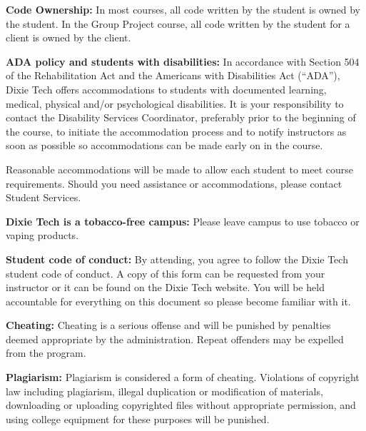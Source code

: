\textbf{Code Ownership:} In most courses, all code written by the student is owned by the student.
In the Group Project course, all code written by the student for a client is owned by the client.
\par
\bigskip
\textbf{ADA policy and students with disabilities:} In accordance with Section 504 of the Rehabilitation
Act and the Americans with Disabilities Act (“ADA”), Dixie Tech offers accommodations to students
with documented learning, medical, physical and/or psychological disabilities. It is your responsibility to
contact the Disability Services Coordinator, preferably prior to the beginning of the course, to initiate the
accommodation process and to notify instructors as soon as possible so accommodations can be made
early on in the course.
\par
\bigskip
Reasonable accommodations will be made to allow each student to meet course requirements. Should
you need assistance or accommodations, please contact Student Services.
\par
\bigskip
\textbf{Dixie Tech is a tobacco-free campus:} Please leave campus to use tobacco or vaping products.
\par
\bigskip
\textbf{Student code of conduct:} By attending, you agree to follow the Dixie Tech student code of conduct.
A copy of this form can be requested from your instructor or it can be found on the Dixie Tech website.
You will be held accountable for everything on this document so please become familiar with it.
\par
\bigskip
\textbf{Cheating:} Cheating is a serious offense and will be punished by penalties deemed appropriate by the
administration. Repeat offenders may be expelled from the program.
\par
\bigskip
\textbf{Plagiarism:} Plagiarism is considered a form of cheating. Violations of copyright law including plagiarism,
illegal duplication or modification of materials, downloading or uploading copyrighted files without
appropriate permission, and using college equipment for these purposes will be punished.
